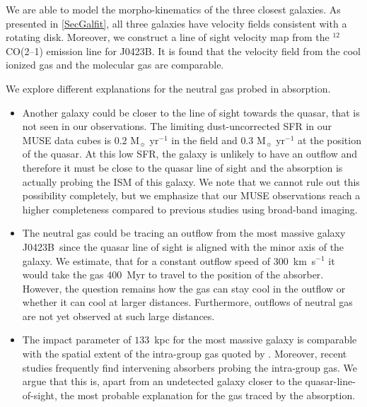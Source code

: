 \documentclass[a4paper,fleqn,usenatbib]{mnras}
\newcommand{\GalB}{J0423B}
\begin{document}
{We are able to model the morpho-kinematics of the three closest galaxies. As presented in \ref{SecGalfit}, all three galaxies have velocity fields consistent with a rotating disk. Moreover, we construct a line of sight velocity map from the $^{12}$CO(2--1) emission line for \GalB. It is found that the velocity field from the cool ionized gas and the molecular gas are comparable.

We explore different explanations for the neutral gas probed in absorption.
\begin{itemize}
\item Another galaxy could be closer to the line of sight towards the quasar, that is not seen in our observations. The limiting dust-uncorrected SFR in our MUSE data cubes is $0.2 \text{ M}_{\sun} \text{ yr}^{-1}$ in the field and $0.3 \text{ M}_{\sun} \text{ yr}^{-1}$ at the position of the quasar. At this low SFR, the galaxy is unlikely to have an outflow and therefore it must be close to the quasar line of sight and the absorption is actually probing the ISM of this galaxy. We note that we cannot rule out this possibility completely, but we emphasize that our MUSE observations reach a higher completeness compared to previous studies using broad-band imaging.
\item The neutral gas could be tracing an outflow from the most massive galaxy \GalB\ since the quasar line of sight is aligned with the minor axis of the galaxy. We estimate, that for a constant outflow speed of $300$~km~s$^{-1}$ it would take the gas $400$~Myr to travel to the position of the absorber. However, the question remains how the gas can stay cool in the outflow or whether it can cool at larger distances. Furthermore, outflows of neutral gas are not yet observed at such large distances.
\item The impact parameter of $133$~kpc for the most massive galaxy is comparable with the spatial extent of the intra-group gas quoted by \mbox{\citet{Bordoloi2011radial}}. Moreover, recent studies frequently find intervening absorbers probing the intra-group gas. We argue that this is, apart from an undetected galaxy closer to the quasar-line-of-sight, the most probable explanation for the gas traced by the absorption.
\end{itemize}

}
\end{document}
